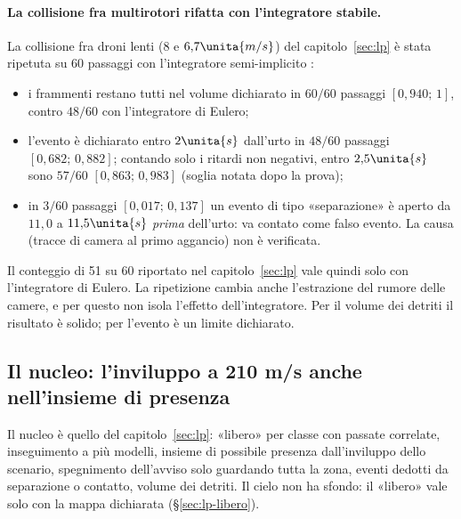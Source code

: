 \paragraph{La collisione fra multirotori rifatta con l'integratore stabile.} La collisione fra droni lenti ($8$ e $6{,}7\unita{m/s}$) del capitolo~\ref{sec:lp} è stata ripetuta su 60 passaggi con l'integratore semi-implicito :
\begin{itemize}
\item i frammenti restano tutti nel volume dichiarato in $60/60$ passaggi $[0{,}940;\,1]$, contro $48/60$ con l'integratore di Eulero;
\item l'evento è dichiarato entro $2\unita{s}$ dall'urto in $48/60$ passaggi $[0{,}682;\,0{,}882]$; contando solo i ritardi non negativi, entro $2{,}5\unita{s}$ sono $57/60$ $[0{,}863;\,0{,}983]$ (soglia notata dopo la prova);
\item in $3/60$ passaggi $[0{,}017;\,0{,}137]$ un evento di tipo «separazione» è aperto da $11{,}0$ a $11{,}5\unita{s}$ \emph{prima} dell'urto: va contato come falso evento. La causa (tracce di camera al primo aggancio) non è verificata.
\end{itemize}
Il conteggio di 51 su 60 riportato nel capitolo~\ref{sec:lp} vale quindi solo con l'integratore di Eulero. La ripetizione cambia anche l'estrazione del rumore delle camere, e per questo non isola l'effetto dell'integratore. Per il volume dei detriti il risultato è solido; per l'evento è un limite dichiarato.

\subsection{Il nucleo: l'inviluppo a 210 m/s anche nell'insieme di presenza}\label{sec:vo-nucleo}

Il nucleo è quello del capitolo~\ref{sec:lp}: «libero» per classe con passate correlate, inseguimento a più modelli, insieme di possibile presenza dall'inviluppo dello scenario, spegnimento dell'avviso solo guardando tutta la zona, eventi dedotti da separazione o contatto, volume dei detriti. Il cielo non ha sfondo: il «libero» vale solo con la mappa dichiarata (\S\ref{sec:lp-libero}).

